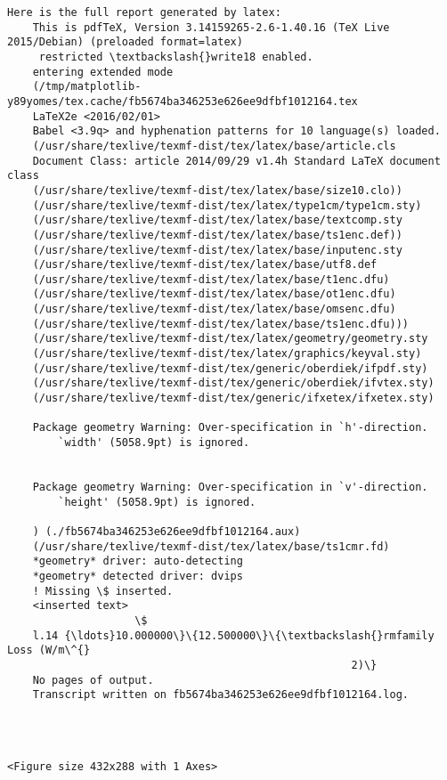 \documentclass[11pt]{article}
\begin{document}
\begin{Verbatim}[commandchars=\\\{\}]
    Here is the full report generated by latex:
    This is pdfTeX, Version 3.14159265-2.6-1.40.16 (TeX Live 2015/Debian) (preloaded format=latex)
     restricted \textbackslash{}write18 enabled.
    entering extended mode
    (/tmp/matplotlib-y89yomes/tex.cache/fb5674ba346253e626ee9dfbf1012164.tex
    LaTeX2e <2016/02/01>
    Babel <3.9q> and hyphenation patterns for 10 language(s) loaded.
    (/usr/share/texlive/texmf-dist/tex/latex/base/article.cls
    Document Class: article 2014/09/29 v1.4h Standard LaTeX document class
    (/usr/share/texlive/texmf-dist/tex/latex/base/size10.clo))
    (/usr/share/texlive/texmf-dist/tex/latex/type1cm/type1cm.sty)
    (/usr/share/texlive/texmf-dist/tex/latex/base/textcomp.sty
    (/usr/share/texlive/texmf-dist/tex/latex/base/ts1enc.def))
    (/usr/share/texlive/texmf-dist/tex/latex/base/inputenc.sty
    (/usr/share/texlive/texmf-dist/tex/latex/base/utf8.def
    (/usr/share/texlive/texmf-dist/tex/latex/base/t1enc.dfu)
    (/usr/share/texlive/texmf-dist/tex/latex/base/ot1enc.dfu)
    (/usr/share/texlive/texmf-dist/tex/latex/base/omsenc.dfu)
    (/usr/share/texlive/texmf-dist/tex/latex/base/ts1enc.dfu)))
    (/usr/share/texlive/texmf-dist/tex/latex/geometry/geometry.sty
    (/usr/share/texlive/texmf-dist/tex/latex/graphics/keyval.sty)
    (/usr/share/texlive/texmf-dist/tex/generic/oberdiek/ifpdf.sty)
    (/usr/share/texlive/texmf-dist/tex/generic/oberdiek/ifvtex.sty)
    (/usr/share/texlive/texmf-dist/tex/generic/ifxetex/ifxetex.sty)
    
    Package geometry Warning: Over-specification in `h'-direction.
        `width' (5058.9pt) is ignored.
    
    
    Package geometry Warning: Over-specification in `v'-direction.
        `height' (5058.9pt) is ignored.
    
    ) (./fb5674ba346253e626ee9dfbf1012164.aux)
    (/usr/share/texlive/texmf-dist/tex/latex/base/ts1cmr.fd)
    *geometry* driver: auto-detecting
    *geometry* detected driver: dvips
    ! Missing \$ inserted.
    <inserted text> 
                    \$
    l.14 {\ldots}10.000000\}\{12.500000\}\{\textbackslash{}rmfamily Loss (W/m\^{}
                                                      2)\}
    No pages of output.
    Transcript written on fb5674ba346253e626ee9dfbf1012164.log.
    
    


    \end{Verbatim}

    
    \begin{verbatim}
<Figure size 432x288 with 1 Axes>
    \end{verbatim}
\end{document}
